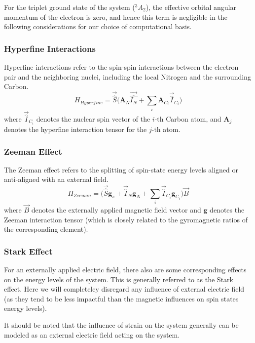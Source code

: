 \documentclass[10pt,a4paper]{article}
\begin{document}
\begin{multicols}{2}
For the triplet ground state of the system ($^3A_2$), the effective orbital angular momentum of the electron is zero, and hence this term is negligible in the following considerations \cite{gali2019ab} for our choice of computational basis.

\subsubsection{Hyperfine Interactions}
Hyperfine interactions refer to the spin-spin interactions between the electron pair and the neighboring nuclei, including the local Nitrogen and the surrounding Carbon.
$$
H_{Hyperfine}=\vec{\hat{S}}\big(\mathbf{A}_N\vec{\hat{I_N}}+\sum_i\mathbf{A}_{C_i}\vec{\hat{I}}_{C_i}\big)
$$
where $\vec{\hat{I}}_{C_i}$ denotes the nuclear spin vector of the $i$-th Carbon atom, and $\mathbf{A}_j$ denotes the hyperfine interaction tensor for the $j$-th atom. 

\subsubsection{Zeeman Effect}
The Zeeman effect refers to the splitting of spin-state energy levels aligned or anti-aligned with an external field.
$$
H_{Zeeman}=\big(\vec{\hat{S}}\mathbf{g}_s+\vec{\hat{I}}_N\mathbf{g}_N+\sum_i\vec{\hat{I}}_{C_i}\mathbf{g}_{C_i}\big)\vec{B}
$$
where $\vec{B}$ denotes the externally applied magnetic field vector and $\mathbf{g}$ denotes the Zeeman interaction tensor (which is closely related to the gyromagnetic ratios of the corresponding element).

\subsubsection{Stark Effect}
For an externally applied electric field, there also are some corresponding effects on the energy levels of the system. This is generally referred to as the Stark effect. Here we will completeley disregard any influence of external electric field (as they tend to be less impactful than the magnetic influences on spin states energy levels).

It should be noted that the influence of strain on the system generally can be modeled as an external electric field acting on the system.


\end{multicols}
\end{document}
